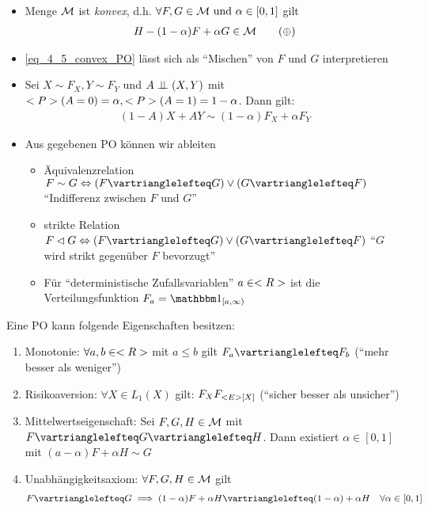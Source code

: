 \begin{*remark}
	\begin{itemize}
		\item Menge $\MM$ ist \emph{konvex}, d.h. $\forall F,G \in \MM  \und \alpha \in [0,1]$ gilt
		\begin{align*}
			H - (1-\alpha)F + \alpha G \in \MM \tag{$\oplus$}\label{eq_4_5_convex_PO}
		\end{align*}
		\item \eqref{eq_4_5_convex_PO} lässt sich als ``Mischen'' von $F$ und $G$ interpretieren
		\item Sei $X \sim F_X, Y \sim F_Y$ und $A \upmodels (X,Y)$ mit $\P(A=0) = \alpha, \P(A=1) = 1-\alpha$. Dann gilt:
		\begin{align*}
			(1-A)X + A Y \sim (1-\alpha)F_X + \alpha F_Y
		\end{align*}
		\item Aus gegebenen PO können wir ableiten
		\begin{itemize}
			\item Äquivalenzrelation $F\sim G \Leftrightarrow (F \vartrianglelefteq G)\vee (G \vartrianglelefteq F)$ ``Indifferenz zwischen $F$ und $G$''
			\item strikte Relation $F \lhd G \Leftrightarrow (F \vartrianglelefteq G)\vee (G \vartrianglelefteq F)$ ``$G$ wird strikt gegenüber $F$ bevorzugt''
			\item Für ``deterministische Zufallsvariablen'' $a \in \R$ ist die Verteilungsfunktion $F_a = \indi_{[a, \infty)}$
		\end{itemize}
	\end{itemize}
\end{*remark}
Eine PO kann folgende Eigenschaften besitzen:
\begin{enumerate}
	\item Monotonie: $\forall a,b \in \R$ mit $a\le b$ gilt $F_a \vartrianglelefteq F_b$ (``mehr besser als weniger'')
	\item Risikoaversion: $\forall X \in L_1(X)$ gilt: $F_X F_{\E[X]}$ (``sicher besser als unsicher'')
	\item Mittelwertseigenschaft: Sei $F,G,H \in \MM$ mit $F \vartrianglelefteq G \vartrianglelefteq H$. Dann existiert $\alpha \in [0,1]$ mit $(a-\alpha)F + \alpha H \sim G$
	\item Unabhängigkeitsaxiom: $\forall F,G,H \in \MM$ gilt
	\begin{align*}
		F \vartrianglelefteq G \implies (1-\alpha)F + \alpha H \vartrianglelefteq (1-\alpha) + \alpha H \quad \forall \alpha \in [0,1]
	\end{align*} 
\end{enumerate}
